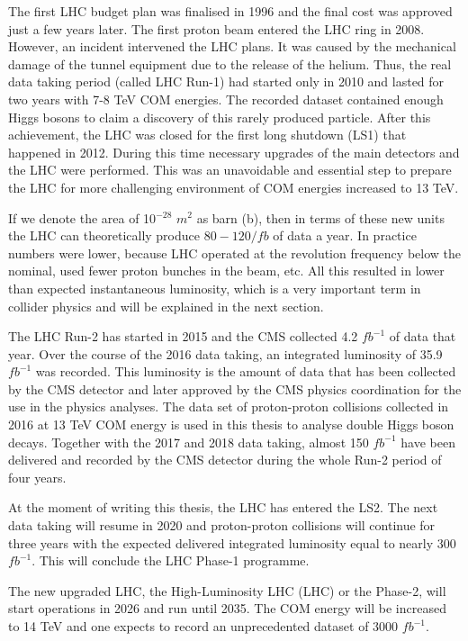 \begin{normalsize}
The first LHC budget plan was finalised in 1996 and the final cost was approved just a few years later. The first proton beam entered the LHC ring in 2008. However, an incident intervened the LHC plans. It was caused by the mechanical damage of the tunnel equipment due to the release of the helium. Thus, the real data taking period (called LHC Run-1) had started only in 2010 and lasted for two years with 7-8 TeV COM energies. The recorded dataset contained enough Higgs bosons to claim a discovery of this rarely produced particle. After this achievement, the LHC was closed for the first long shutdown (LS1) that happened in 2012. During this time necessary upgrades of the main detectors and the LHC were performed. This was an unavoidable and essential step to prepare the LHC for more challenging environment of COM energies increased to 13 TeV. 


If we denote the area of 10$^{-28}$ $m^2$ as barn (b), then in terms of these new units the LHC can theoretically produce $80-120/fb$ of data a year. In practice numbers were lower, because LHC operated at the revolution frequency below the nominal, used fewer proton bunches in the beam, etc.  All this resulted in lower than expected instantaneous luminosity, which is a very important term in collider physics and will be explained in the next section.

The LHC Run-2 has started in 2015 and the CMS collected 4.2 $fb^{-1}$ of data that year. Over the course of the 2016 data taking, an integrated luminosity of 35.9 $fb^{-1}$ was recorded. This luminosity is the amount of data that has been collected by the CMS detector and later approved by the CMS physics coordination for the use in the physics analyses. The data set of proton-proton collisions collected in 2016 at 13 TeV COM energy is used in this thesis to analyse double Higgs boson decays. Together with the 2017 and 2018 data taking, almost 150 $fb^{-1}$ have been delivered and recorded by the CMS detector during the whole Run-2 period of four years. 

At the moment of writing this thesis, the LHC has entered the LS2. The next data taking will resume in 2020 and proton-proton collisions will continue for three years with the expected delivered integrated luminosity equal to nearly 300 $fb^{-1}$. This will conclude the LHC Phase-1 programme. 

The new upgraded LHC, the High-Luminosity LHC (LHC) or the Phase-2, will start operations in 2026 and run until 2035. The COM energy will be increased to 14 TeV and one expects to record an unprecedented dataset of 3000 $fb^{-1}$. 


\end{normalsize}
